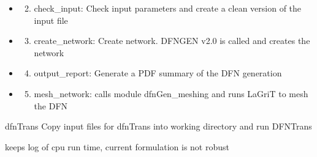\documentclass[letterpaper,10pt,english]{sphinxmanual}
\begin{document}
\begin{fulllineitems}
\begin{fulllineitems}
\begin{description}
\begin{itemize}
\item {} \begin{enumerate}
\setcounter{enumi}{1}
\item {} 
check\_input: Check input parameters and create a clean version of the input file

\end{enumerate}

\item {} \begin{enumerate}
\setcounter{enumi}{2}
\item {} 
create\_network: Create network. DFNGEN v2.0 is called and creates the network

\end{enumerate}

\item {} \begin{enumerate}
\setcounter{enumi}{3}
\item {} 
output\_report: Generate a PDF summary of the DFN generation

\end{enumerate}

\item {} \begin{enumerate}
\setcounter{enumi}{4}
\item {} 
mesh\_network: calls module dfnGen\_meshing and runs LaGriT to mesh the DFN

\end{enumerate}

\end{itemize}

\end{description}

\end{fulllineitems}


\begin{fulllineitems}
\label{pydfnworks:pydfnworks.DFNWORKS.dfn_trans}
dfnTrans
Copy input files for dfnTrans into working directory and run DFNTrans

\end{fulllineitems}


\begin{fulllineitems}
\label{pydfnworks:pydfnworks.DFNWORKS.dump_time}
keeps log of cpu run time, current formulation is not robust


\end{fulllineitems}
\end{fulllineitems}
\end{document}
